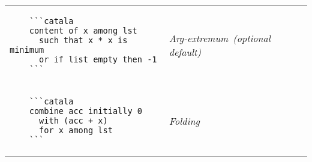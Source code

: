 \documentclass{article}
\makeatletter
\newenvironment{catala}{%
  \VerbatimEnvironment
  \let\FV@ListVSpace\relax
  \begin{verbatim}}%
 {\end{verbatim}}
\makeatother
\begin{document}
\begin{multicols}{3}
\begin{tabular}{@{}p{\cola}>{\slshape}p{\colb}@{}}
  \\
  \begin{catala}
    ```catala
    content of x among lst
      such that x * x is minimum
      or if list empty then -1
    ```
  \end{catala}
  & Arg-extremum\newline ~\newline (optional default)
  \\
  \begin{catala}
    ```catala
    combine acc initially 0
      with (acc + x)
      for x among lst
    ```
  \end{catala}
  & Folding
  \\
\end{tabular}

\end{multicols}
\end{document}
